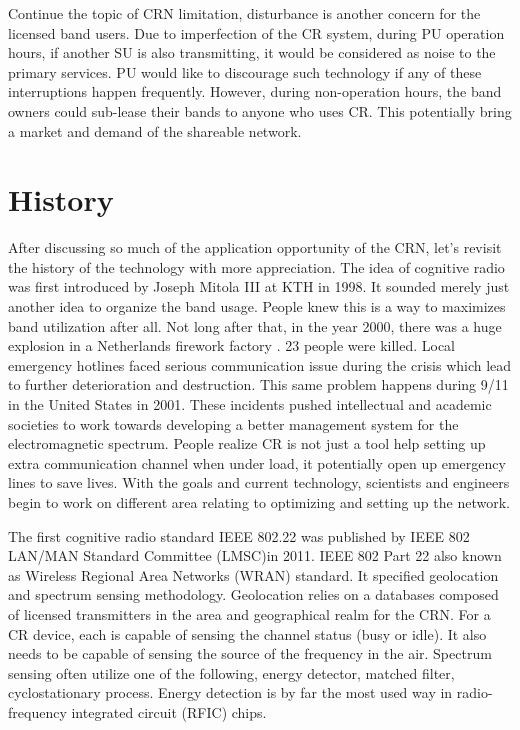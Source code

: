 Continue the topic of CRN limitation, disturbance is another concern for the licensed band users. Due to imperfection of
the CR system, during PU operation hours, if another SU is also transmitting, it would be considered as noise to the 
primary services. PU would like to discourage such technology if any of these interruptions happen frequently. However,
during non-operation hours, the band owners could sub-lease their bands to anyone who uses CR. This potentially bring a
market and demand of the shareable network.

\section{History}
After discussing so much of the application opportunity of the CRN, let's revisit the history of the technology with 
more appreciation. The idea of cognitive radio was first introduced by Joseph Mitola III at KTH in 1998. It sounded 
merely just another idea to organize the band usage. People knew this is a way to maximizes band utilization after all.
Not long after that, in the year 2000, there was a huge explosion in a Netherlands firework factory \cite{cr_history}. 
23 people were killed. Local emergency hotlines faced serious communication issue during the crisis which lead to further
deterioration and destruction. This same problem happens during 9/11 in the United States in 2001. These incidents
pushed intellectual and academic societies to work towards developing a better management system for the electromagnetic
spectrum. People realize CR is not just a tool help setting up extra communication channel when under load, it
potentially open up emergency lines to save lives. With the goals and current technology, scientists and engineers
begin to work on different area relating to optimizing and setting up the network.

The first cognitive radio standard IEEE 802.22 was published by IEEE 802 LAN/MAN Standard Committee (LMSC)in 2011. 
IEEE 802 Part 22 also known as Wireless Regional Area Networks (WRAN) standard. It specified geolocation and spectrum
sensing methodology. Geolocation relies on a databases composed of licensed transmitters in the area and geographical 
realm for the CRN. For a CR device, each is capable of sensing the channel status (busy or idle). It also needs to be 
capable of sensing the source of the frequency in the air. Spectrum sensing often utilize one of the following, energy 
detector, matched filter, cyclostationary process. Energy detection is by far the most used way in radio-frequency 
integrated circuit (RFIC) chips. 


